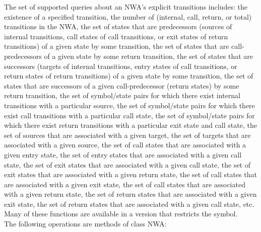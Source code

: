 \documentclass{llncs}
\begin{document}
The set of supported queries about an NWA's explicit transitions includes: the existence of a specified transition, the number of (internal, call, return, or total) transitions in the NWA, the set of states that are predecessors (sources of internal transitions, call states of call transitions, or exit states of return transitions) of a given state by some transition, the set of states that are call-predecessors of a given state by some return transition, the set of states that are successors (targets of internal transitions, entry states of call transitions, or return states of return transitions) of a given state by some transition, the set of states that are successors of a given call-predecessor (return states) by some return transition, the set of symbol/state pairs for which there exist internal transitions with a particular source, the set of symbol/state pairs for which there exist call transitions with a particular call state, the set of symbol/state pairs for which there exist return transitions with a particular exit state and call state, the set of sources that are associated with a given target, the set of targets that are associated with a given source, the set of call states that are associated with a given entry state, the set of entry states that are associated with a given call state, the set of exit states that are associated with a given call state, the set of exit states that are associated with a given return state, the set of call states that are associated with a given exit state, the set of call states that are associated with a given return state, the set of return states that are associated with a given exit state, the set of return states that are associated with a given call state, etc.  Many of these functions are available in a version that restricts the symbol. \\

\noindent The following operations are methods of class NWA:
\end{document}
